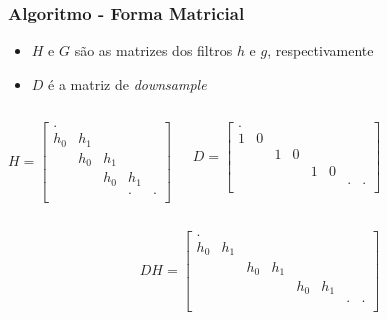 \begin{frame}[allowframebreaks]
  \frametitle{Algoritmo - Forma Matricial}
  
  \begin{itemize}
        \item $H$ e $G$ são as matrizes dos filtros $h$ e $g$, respectivamente
        \item $D$ é a matriz de \emph{downsample}
  \end{itemize}

  \begin{columns}[c]
  \begin{equation}
  H =
    \begin{bmatrix}
    .   &     &     &     &    \\
    h_0 & h_1 &     &     &    \\
        & h_0 & h_1 &     &    \\
        &     & h_0 & h_1 &    \\
        &     &     & .   & .  \\
  \end{bmatrix}
  \label{eq:filtragem_matricial}
  \end{equation}

  \begin{equation}
  D =
  \begin{bmatrix}
  .   &     &     &     &     &     &     &    \\
  1   &  0  &     &     &     &     &     &    \\
      &     &  1  &  0  &     &     &     &    \\
      &     &     &     &  1  &  0  &     &    \\
      &     &     &     &     &     &  .  & .  \\
  \end{bmatrix}
  \label{eq:matriz_decimacao_2}
  \end{equation}
  \end{columns}


  \framebreak
  
  \begin{equation}
  DH =
  \begin{bmatrix}
  .   &     &     &     &     &     &      &    \\
  h_0 & h_1 &     &     &     &     &      &    \\
      &     & h_0 & h_1 &     &     &      &    \\
      &     &     &     & h_0 & h_1 &      &    \\
      &     &     &     &     &     &  .   & .  \\
  \end{bmatrix}
  \label{eq:filtragem_matricial}
  \end{equation}


\end{frame}
